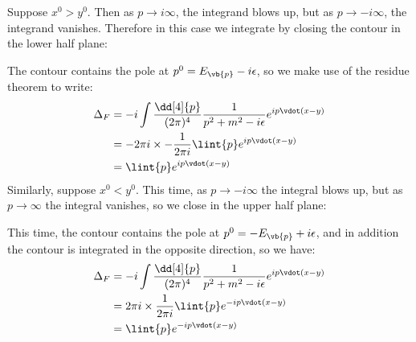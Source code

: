 \documentclass{jknotes} %
\begin{document}
Suppose \(x^0>y^0\). Then as \(p\rightarrow i\infty\), the integrand blows up, but as \(p\rightarrow -i\infty\), the integrand vanishes. Therefore in this case we integrate by closing the contour in the lower half plane:
\begin{figure}[H]
    \centering
\end{figure}
The contour contains the pole at \(p^0=E_{\vb{p}}-i\epsilon\), so we make use of the residue theorem to write:
\begin{align}
    \Delta_F &= -i \int \frac{\dd[4]{p}}{(2\pi)^4}\frac{1}{p^2+m^2-i\epsilon}e^{ip\vdot(x-y)}\\
    &= -2\pi i \times -\frac{1}{2\pi i}\lint{p}e^{ip\vdot(x-y)} \\
    &= \lint{p}e^{ip\vdot(x-y)}
\end{align}
Similarly, suppose \(x^0<y^0\). This time, as \(p\rightarrow -i\infty\) the integral blows up, but as \(p\rightarrow\infty\) the integral vanishes, so we close in the upper half plane:
\begin{figure}[H]
    \centering
\end{figure}
This time, the contour contains the pole at \(p^0=-E_{\vb{p}}+i\epsilon\), and in addition the contour is integrated in the opposite direction, so we have:
\begin{align}
    \Delta_F &= -i \int \frac{\dd[4]{p}}{(2\pi)^4}\frac{1}{p^2+m^2-i\epsilon}e^{ip\vdot(x-y)}\\
    &= 2\pi i \times \frac{1}{2\pi i}\lint{p}e^{-ip\vdot(x-y)} \\
    &= \lint{p}e^{-ip\vdot(x-y)}
\end{align}
\end{document}
